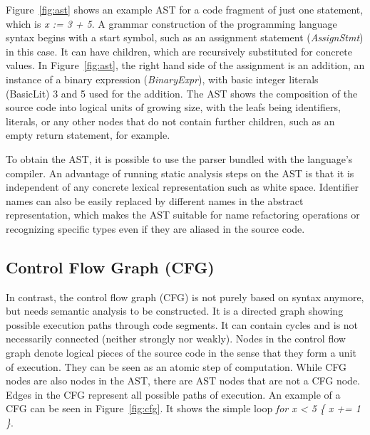 

Figure~\ref{fig:ast} shows an example \acrshort{AST} for a code fragment of just one statement, which is
\textit{x := 3 + 5}.
A grammar construction of the programming language syntax begins with a start symbol, such as an assignment statement
(\textit{AssignStmt}) in this case.
It can have children, which are recursively substituted for concrete values.
In Figure~\ref{fig:ast}, the right hand side of the assignment is an addition, an instance of a binary expression
(\textit{BinaryExpr}), with basic integer literals (\acrshort{BasicLit}) 3 and 5 used for the addition.
The \acrshort{AST} shows the composition of the source code into logical units of growing size, with the leafs being
identifiers, literals, or any other nodes that do not contain further children, such as an empty return statement, for
example.

To obtain the \acrshort{AST}, it is possible to use the parser bundled with the language's compiler.
An advantage of running static analysis steps on the \acrshort{AST} is that it is independent of any concrete lexical
representation such as white space.
Identifier names can also be easily replaced by different names in the abstract representation, which makes the
\acrshort{AST} suitable for name refactoring operations or recognizing specific types even if they are aliased in the
source code.



\subsection{Control Flow Graph (CFG)}\label{subsec:background:static-code-analysis:cfg}

In contrast, the control flow graph (\acrshort{CFG}) is not purely based on syntax anymore, but needs semantic analysis
to be constructed.
It is a directed graph showing possible execution paths through code segments.
It can contain cycles and is not necessarily connected (neither strongly nor weakly).
Nodes in the control flow graph denote logical pieces of the source code in the sense that they form a unit of
execution.
They can be seen as an atomic step of computation.
While \acrshort{CFG} nodes are also nodes in the \acrshort{AST}, there are \acrshort{AST} nodes that are not a
\acrshort{CFG} node.
Edges in the \acrshort{CFG} represent all possible paths of execution.
An example of a \acrshort{CFG} can be seen in Figure~\ref{fig:cfg}.
It shows the simple loop \textit{for x < 5 \{ x += 1 \}}.

